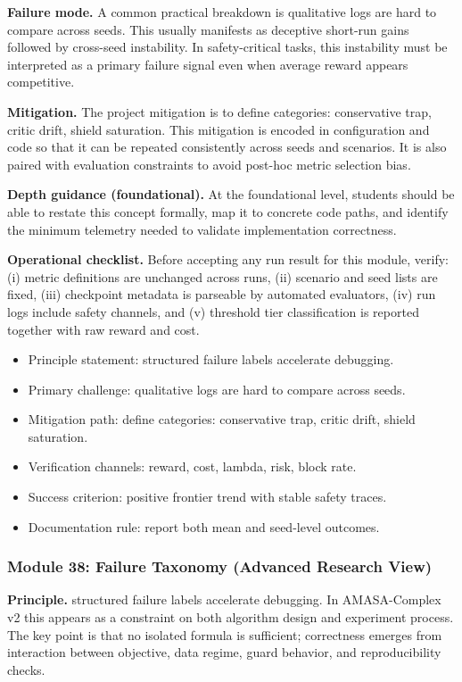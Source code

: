 \documentclass[conference]{IEEEtran}
\begin{document}
\textbf{Failure mode.} A common practical breakdown is qualitative logs are hard to compare across seeds. This usually manifests as deceptive short-run gains followed by cross-seed instability. In safety-critical tasks, this instability must be interpreted as a primary failure signal even when average reward appears competitive.

\textbf{Mitigation.} The project mitigation is to define categories: conservative trap, critic drift, shield saturation. This mitigation is encoded in configuration and code so that it can be repeated consistently across seeds and scenarios. It is also paired with evaluation constraints to avoid post-hoc metric selection bias.

\textbf{Depth guidance (foundational).} At the foundational level, students should be able to restate this concept formally, map it to concrete code paths, and identify the minimum telemetry needed to validate implementation correctness.

\textbf{Operational checklist.} Before accepting any run result for this module, verify: (i) metric definitions are unchanged across runs, (ii) scenario and seed lists are fixed, (iii) checkpoint metadata is parseable by automated evaluators, (iv) run logs include safety channels, and (v) threshold tier classification is reported together with raw reward and cost.

\begin{itemize}[leftmargin=*]
  \item Principle statement: structured failure labels accelerate debugging.
  \item Primary challenge: qualitative logs are hard to compare across seeds.
  \item Mitigation path: define categories: conservative trap, critic drift, shield saturation.
  \item Verification channels: reward, cost, lambda, risk, block rate.
  \item Success criterion: positive frontier trend with stable safety traces.
  \item Documentation rule: report both mean and seed-level outcomes.
\end{itemize}


\subsubsection{Module 38: Failure Taxonomy (Advanced Research View)}
\textbf{Principle.} structured failure labels accelerate debugging. In AMASA-Complex v2 this appears as a constraint on both algorithm design and experiment process. The key point is that no isolated formula is sufficient; correctness emerges from interaction between objective, data regime, guard behavior, and reproducibility checks.
\end{document}
